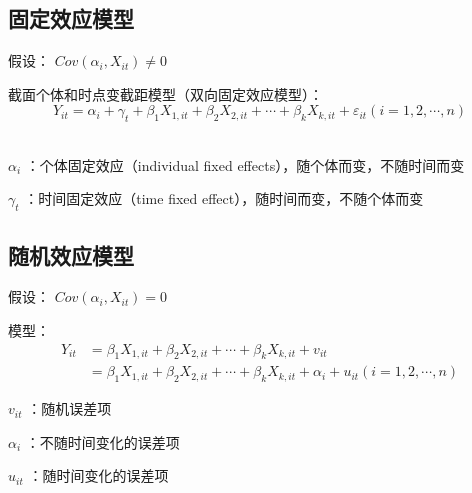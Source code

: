 \documentclass[12pt]{book}
\begin{document}
\subsection{固定效应模型}

假设： $Cov(\alpha_i,X_{it})\neq0$

截面个体和时点变截距模型（双向固定效应模型）：
$$Y_{it} =\alpha_i+\gamma_t+\beta_1X_{1,it}+\beta_2X_{2,it}+\cdots+\beta_kX_{k,it}+\varepsilon_{it}\left(i=1,2,\cdots,n\right) $$ \\  
\par $\alpha_i$ ：个体固定效应（individual fixed effects），随个体而变，不随时间而变
\par $\gamma_t$ ：时间固定效应（time fixed effect），随时间而变，不随个体而变


\subsection{随机效应模型}
假设： $Cov(\alpha_i,X_{it})=0 $

模型：
\begin{align*} 
    Y_{it} & = \beta_1 X_{1,it}+\beta_2 X_{2,it}+\cdots +\beta_k X_{k,it}+v_{it} \\ & =\beta_1 X_{1,it}+\beta_2 X_{2,it}+\cdots +\beta_k X_{k,it}+\alpha_i+u_{it} (i=1,2,⋯,n) 
\end{align*} 
\par $v_{it}$ ：随机误差项
\par $\alpha_i$ ：不随时间变化的误差项
\par $u_{it}$ ：随时间变化的误差项
\end{document}
